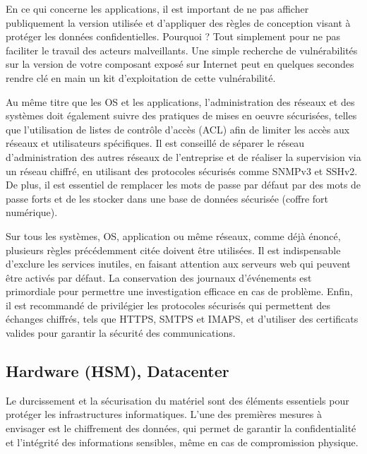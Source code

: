En ce qui concerne les applications, il est important de ne pas afficher publiquement la version utilisée et d'appliquer des règles de conception visant à protéger les données confidentielles.
Pourquoi ? Tout simplement pour ne pas faciliter le travail des acteurs malveillants. Une simple recherche de vulnérabilités sur la version de votre composant exposé sur Internet peut en quelques secondes rendre clé en main un kit d'exploitation de cette vulnérabilité.

Au même titre que les OS et les applications, l'administration des réseaux et des systèmes doit également suivre des pratiques de mises en oeuvre sécurisées, telles que l'utilisation de listes de contrôle d'accès (ACL) afin de limiter les accès aux réseaux et utilisateurs spécifiques. Il est conseillé de séparer le réseau d'administration des autres réseaux de l'entreprise et de réaliser la supervision via un réseau chiffré, en utilisant des protocoles sécurisés comme SNMPv3 et SSHv2. De plus, il est essentiel de remplacer les mots de passe par défaut par des mots de passe forts et de les stocker dans une base de données sécurisée (coffre fort numérique).

Sur tous les systèmes, OS, application ou même réseaux, comme déjà énoncé, plusieurs règles précédemment citée doivent être utilisées. Il est indispensable d'exclure les services inutiles, en faisant attention aux serveurs web qui peuvent être activés par défaut. La conservation des journaux d'événements est primordiale pour permettre une investigation efficace en cas de problème. Enfin, il est recommandé de privilégier les protocoles sécurisés qui permettent des échanges chiffrés, tels que HTTPS, SMTPS et IMAPS, et d'utiliser des certificats valides pour garantir la sécurité des communications.

\subsection{Hardware (HSM), Datacenter}

Le durcissement et la sécurisation du matériel sont des éléments essentiels pour protéger les infrastructures informatiques. L'une des premières mesures à envisager est le chiffrement des données, qui permet de garantir la confidentialité et l'intégrité des informations sensibles, même en cas de compromission physique.

